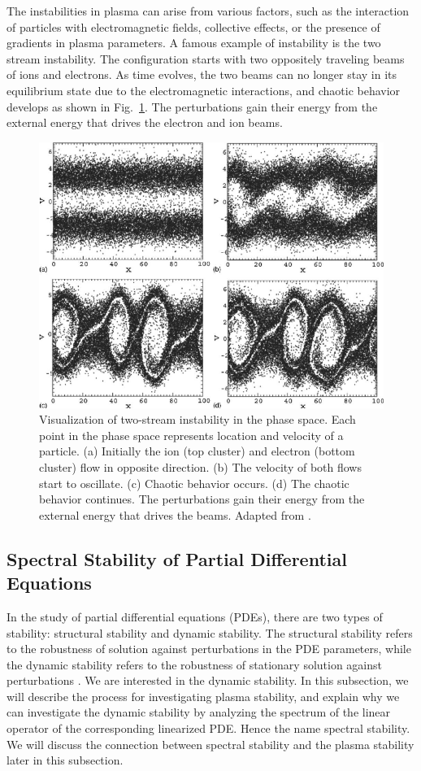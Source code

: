 The instabilities in plasma can arise from various factors, such as the interaction of particles with electromagnetic fields, collective effects, or the presence of gradients in plasma parameters. A famous example of instability is the two stream instability. The configuration starts with two oppositely traveling beams of ions and electrons. As time evolves, the two beams can no longer stay in its equilibrium state due to the electromagnetic interactions, and chaotic behavior develops as shown in Fig.~\ref{fig:two-stream-instability}. The perturbations gain their energy from the external energy that drives the electron and ion beams.

\begin{figure}[htbp]
	\centering
	\includegraphics[width=0.7\linewidth]{figures/two-stream-instability}
	\caption{Visualization of two-stream instability in the phase space. Each point in the phase space represents location and velocity of a particle. (a) Initially the ion (top cluster) and electron (bottom cluster) flow in opposite direction. (b) The velocity of both flows start to oscillate. (c) Chaotic behavior occurs. (d) The chaotic behavior continues. The perturbations gain their energy from the external energy that drives the beams. Adapted from \cite{ha_nonlinear_2011}.}
	\label{fig:two-stream-instability}
\end{figure}

\subsection{Spectral Stability of Partial Differential Equations}
In the study of partial differential equations (PDEs), there are two types of stability: structural stability and dynamic stability. The structural stability refers to the robustness of solution against perturbations in the PDE parameters, while the dynamic stability refers to the robustness of stationary solution against perturbations \cite{beck_spectral_2020}. We are interested in the dynamic stability. In this subsection, we will describe the process for investigating plasma stability, and explain why we can investigate the dynamic stability by analyzing the spectrum of the linear operator of the corresponding linearized PDE. Hence the name spectral stability. We will discuss the connection between spectral stability and the plasma stability later in this subsection.

